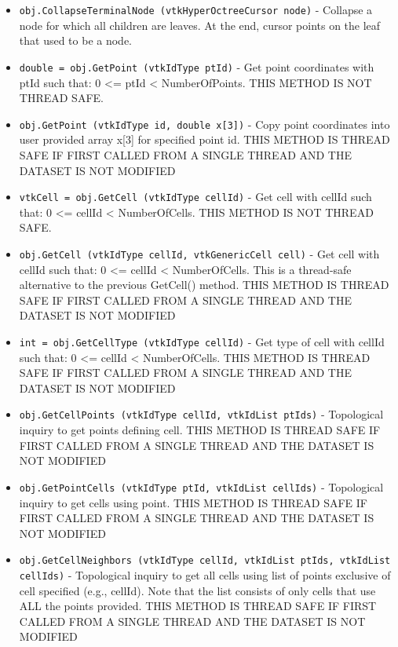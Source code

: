 \begin{itemize}
 

\item  \verb|obj.CollapseTerminalNode (vtkHyperOctreeCursor node)| -  Collapse a node for which all children are leaves.
 At the end, cursor points on the leaf that used to be a node.
 
 
 

\item  \verb|double = obj.GetPoint (vtkIdType ptId)| -  Get point coordinates with ptId such that: 0 <= ptId < NumberOfPoints.
 THIS METHOD IS NOT THREAD SAFE.

\item  \verb|obj.GetPoint (vtkIdType id, double x[3])| -  Copy point coordinates into user provided array x[3] for specified
 point id.
 THIS METHOD IS THREAD SAFE IF FIRST CALLED FROM A SINGLE THREAD AND
 THE DATASET IS NOT MODIFIED

\item  \verb|vtkCell = obj.GetCell (vtkIdType cellId)| -  Get cell with cellId such that: 0 <= cellId < NumberOfCells.
 THIS METHOD IS NOT THREAD SAFE.

\item  \verb|obj.GetCell (vtkIdType cellId, vtkGenericCell cell)| -  Get cell with cellId such that: 0 <= cellId < NumberOfCells. 
 This is a thread-safe alternative to the previous GetCell()
 method.
 THIS METHOD IS THREAD SAFE IF FIRST CALLED FROM A SINGLE THREAD AND
 THE DATASET IS NOT MODIFIED

\item  \verb|int = obj.GetCellType (vtkIdType cellId)| -  Get type of cell with cellId such that: 0 <= cellId < NumberOfCells.
 THIS METHOD IS THREAD SAFE IF FIRST CALLED FROM A SINGLE THREAD AND
 THE DATASET IS NOT MODIFIED

\item  \verb|obj.GetCellPoints (vtkIdType cellId, vtkIdList ptIds)| -  Topological inquiry to get points defining cell.
 THIS METHOD IS THREAD SAFE IF FIRST CALLED FROM A SINGLE THREAD AND
 THE DATASET IS NOT MODIFIED

\item  \verb|obj.GetPointCells (vtkIdType ptId, vtkIdList cellIds)| -  Topological inquiry to get cells using point.
 THIS METHOD IS THREAD SAFE IF FIRST CALLED FROM A SINGLE THREAD AND
 THE DATASET IS NOT MODIFIED

\item  \verb|obj.GetCellNeighbors (vtkIdType cellId, vtkIdList ptIds, vtkIdList cellIds)| -  Topological inquiry to get all cells using list of points exclusive of
 cell specified (e.g., cellId). Note that the list consists of only
 cells that use ALL the points provided.
 THIS METHOD IS THREAD SAFE IF FIRST CALLED FROM A SINGLE THREAD AND
 THE DATASET IS NOT MODIFIED


\end{itemize}
